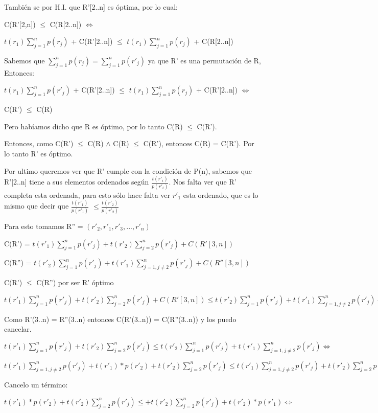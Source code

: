 También se por H.I. que R'[2..n] es óptima, por lo cual: 

C(R'[2,n]) $\leq$ C(R[2..n]) $\iff$

$t(r_1) \sum_{j=1}^{n}p(r_j)$ + C(R'[2..n]) $\leq$  $t(r_1) \sum_{j=1}^{n}p(r_j)$ + C(R[2..n])

Sabemos que $\sum_{j=1}^{n}p(r_j) = \sum_{j=1}^{n}p(r'_j)$ ya que R' es una permutación de R, Entonces:

$t(r_1) \sum_{j=1}^{n}p(r'_j)$ + C(R'[2..n]) $\leq$  $t(r_1) \sum_{j=1}^{n}p(r_j)$ + C(R'[2..n]) $\iff$

C(R') $\leq$ C(R)

Pero habíamos dicho que R es óptimo, por lo tanto C(R) $\leq$ C(R').

Entonces, como C(R') $\leq$ C(R) $\wedge$ C(R) $\leq$ C(R'), entonces C(R) = C(R'). Por lo tanto R' es óptimo.

Por ultimo queremos ver que R' cumple con la condición de P(n), sabemos que R'[2..n] tiene a sus elementos ordenados según $\frac{t(r'_i)}{p(r'_i)}$. Nos falta ver que R' completa esta ordenada, para esto sólo hace falta ver $r'_1$ esta ordenado, que es lo mismo que decir que $\frac{t(r'_1)}{p(r'_1)}$ $\leq \frac{t(r'_2)}{p(r'_2)}$

Para esto tomamos R'' = $(r'_2,r'_1,r'_3,...,r'_n)$

C(R') = $t(r'_1) \sum_{j=1}^{n}p(r'_j) + t(r'_2) \sum_{j=2}^{n}p(r'_j) + C(R'[3,n]) $

C(R'') = $t(r'_2) \sum_{j=1}^{n}p(r'_j) + t(r'_1) \sum_{j=1,j\neq 2}^{n}p(r'_j) + C(R''[3,n]) $

C(R') $\leq$ C(R'') por ser R' óptimo

$t(r'_1) \sum_{j=1}^{n}p(r'_j) + t(r'_2) \sum_{j=2}^{n}p(r'_j) + C(R'[3,n]) \leq t(r'_2) \sum_{j=1}^{n}p(r'_j) + t(r'_1) \sum_{j=1,j\neq 2}^{n}p(r'_j) + C(R''[3,n]) \iff$

Como R'(3..n) = R''(3..n) entonces C(R'(3..n)) = C(R''(3..n)) y los puedo cancelar.

$t(r'_1) \sum_{j=1}^{n}p(r'_j) + t(r'_2) \sum_{j=2}^{n}p(r'_j)  \leq t(r'_2) \sum_{j=1}^{n}p(r'_j) + t(r'_1) \sum_{j=1,j\neq 2}^{n}p(r'_j)  \iff$

$t(r'_1) \sum_{j=1,j\neq 2}^{n}p(r'_j) + t(r'_1) * p(r'_2) + t(r'_2) \sum_{j=2}^{n}p(r'_j) \leq t(r'_1) \sum_{j=1,j\neq 2}^{n}p(r'_j) + t(r'_2) \sum_{j=2}^{n}p(r'_j)+ t(r'_2) * p(r'_1) \iff$  

Cancelo un término:

$t(r'_1) * p(r'_2) + t(r'_2) \sum_{j=2}^{n}p(r'_j) \leq + t(r'_2) \sum_{j=2}^{n}p(r'_j)+ t(r'_2) * p(r'_1) \iff$

